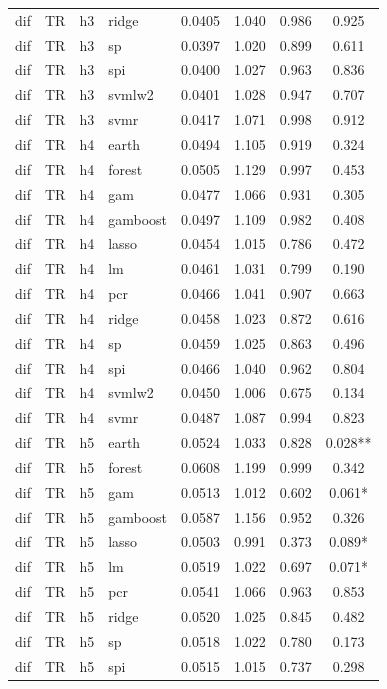 \begin{ThreePartTable}
\begin{longtable}[t]{llclcccc}
dif & TR & h3 & ridge & 0.0405 & 1.040 & 0.986 & 0.925\\
dif & TR & h3 & sp & 0.0397 & 1.020 & 0.899 & 0.611\\
dif & TR & h3 & spi & 0.0400 & 1.027 & 0.963 & 0.836\\
dif & TR & h3 & svmlw2 & 0.0401 & 1.028 & 0.947 & 0.707\\
dif & TR & h3 & svmr & 0.0417 & 1.071 & 0.998 & 0.912\\
\addlinespace
dif & TR & h4 & earth & 0.0494 & 1.105 & 0.919 & 0.324\\
dif & TR & h4 & forest & 0.0505 & 1.129 & 0.997 & 0.453\\
dif & TR & h4 & gam & 0.0477 & 1.066 & 0.931 & 0.305\\
dif & TR & h4 & gamboost & 0.0497 & 1.109 & 0.982 & 0.408\\
dif & TR & h4 & lasso & 0.0454 & 1.015 & 0.786 & 0.472\\
dif & TR & h4 & lm & 0.0461 & 1.031 & 0.799 & 0.190\\
dif & TR & h4 & pcr & 0.0466 & 1.041 & 0.907 & 0.663\\
dif & TR & h4 & ridge & 0.0458 & 1.023 & 0.872 & 0.616\\
dif & TR & h4 & sp & 0.0459 & 1.025 & 0.863 & 0.496\\
dif & TR & h4 & spi & 0.0466 & 1.040 & 0.962 & 0.804\\
dif & TR & h4 & svmlw2 & 0.0450 & 1.006 & 0.675 & 0.134\\
dif & TR & h4 & svmr & 0.0487 & 1.087 & 0.994 & 0.823\\
\addlinespace
dif & TR & h5 & earth & 0.0524 & 1.033 & 0.828 & 0.028**\\
dif & TR & h5 & forest & 0.0608 & 1.199 & 0.999 & 0.342\\
dif & TR & h5 & gam & 0.0513 & 1.012 & 0.602 & 0.061*\\
dif & TR & h5 & gamboost & 0.0587 & 1.156 & 0.952 & 0.326\\
dif & TR & h5 & lasso & 0.0503 & 0.991 & 0.373 & 0.089*\\
dif & TR & h5 & lm & 0.0519 & 1.022 & 0.697 & 0.071*\\
dif & TR & h5 & pcr & 0.0541 & 1.066 & 0.963 & 0.853\\
dif & TR & h5 & ridge & 0.0520 & 1.025 & 0.845 & 0.482\\
dif & TR & h5 & sp & 0.0518 & 1.022 & 0.780 & 0.173\\
dif & TR & h5 & spi & 0.0515 & 1.015 & 0.737 & 0.298\\

\end{longtable}
\end{ThreePartTable}
